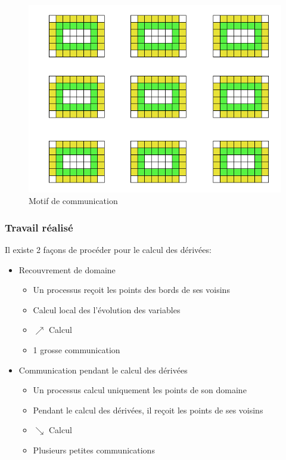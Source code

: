 \begin{figure}
\centering
\includegraphics[scale=0.5]{figures/halo.png}
  \caption{\label{fig:neighbor_buf} Motif de communication}
\end{figure}

\subsubsection{Travail réalisé}
Il existe 2 façons de procéder pour le calcul des dérivées:

\begin{itemize}
  \item Recouvrement de domaine
    \begin{itemize}
    \item Un processus reçoit les points des bords de ses voisins
    \item Calcul local des l'évolution des variables
    \item $\nearrow$ Calcul 
    \item 1 grosse communication
    \end{itemize}
  \item Communication pendant le calcul des dérivées
    \begin{itemize}
    \item Un processus calcul uniquement les points de son domaine
    \item Pendant le calcul des dérivées, il reçoit les points de ses voisins
    \item $\searrow$ Calcul 
    \item Plusieurs petites communications
    \end{itemize}
\end{itemize}


